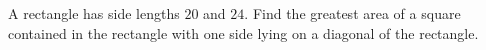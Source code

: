A rectangle has side lengths $20$ and $24$. Find the greatest area of a square contained in the rectangle with one side lying on a diagonal of the rectangle.

